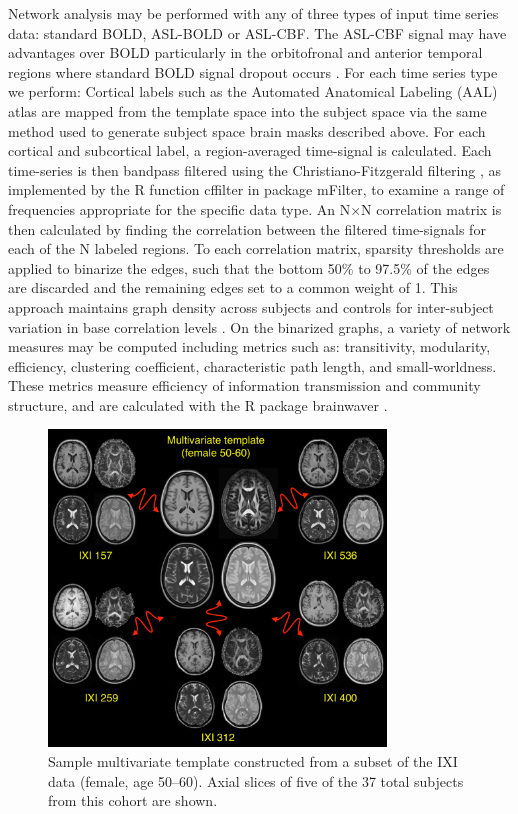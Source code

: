 Network analysis may be performed with any of three types of input
time series data:  standard BOLD, ASL-BOLD or ASL-CBF.  The ASL-CBF
signal may have advantages over BOLD particularly in the orbitofronal
and anterior temporal regions where standard BOLD signal dropout
occurs \cite{Jann2013,Orosz2012}.  For each time series type we perform:
\newline
{} Cortical labels such as the Automated Anatomical
Labeling (AAL) atlas \cite{Tzourio-Mazoyer2002} are mapped from
the template space into the subject space via the same method used to
generate subject space brain masks described above. For each cortical
and subcortical label, a region-averaged time-signal is
calculated. Each time-series is then bandpass filtered using the
Christiano-Fitzgerald filtering \cite{Christiano2003}, as
implemented by the R function cffilter in package mFilter, to examine
a range of frequencies appropriate for the specific data type. An N$\times$N
correlation matrix is then calculated by finding the correlation
between the filtered time-signals for each of the N labeled regions.
\newline
{} To each correlation matrix, sparsity thresholds are
applied to binarize the edges, such that the bottom 50\% to 97.5\% of
the edges are discarded and the remaining edges set to a common
weight of 1.  This approach maintains graph density across subjects
and controls for inter-subject variation in base correlation levels
\cite{Liu2008, Power2011, Schwarz2011, Braun2012, Liang2012}. 
On the binarized graphs, a variety of network measures may be
computed including metrics such as: transitivity,
modularity, efficiency, clustering coefficient, characteristic path
length, and small-worldness. These metrics measure efficiency of
information transmission and community structure, and are calculated
with the R package brainwaver \cite{Achard2006}.


\begin{figure}
  \centering
  \includegraphics[width=0.8\textwidth]{figs/template50_60.pdf}
  \caption{Sample multivariate template constructed from a subset of the IXI data (female, age 50--60).  Axial slices of five of the 37 total subjects from this cohort are shown. }
  \label{fig:template}
\end{figure}



